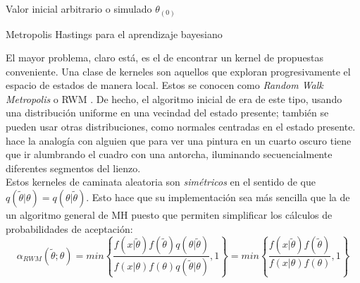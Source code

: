 \begin{algorithm}
\DontPrintSemicolon



Valor inicial arbitrario o simulado $\theta_{(0)}$\;

\caption{Metropolis Hastings para el aprendizaje bayesiano \label{alg:MH}}
\end{algorithm}

El mayor problema, claro está, es el de encontrar un kernel de propuestas conveniente. Una clase de kerneles son aquellos que exploran progresivamente el espacio de estados de manera local. Estos se conocen como \textit{Random Walk Metropolis} o RWM \parencite{RobertCasella10}. De hecho, el algoritmo inicial de \textcite{Metropolis53} era de este tipo, usando una distribución uniforme en una vecindad del estado presente; también se pueden usar otras distribuciones, como normales centradas en el estado presente. \textcite{Robert15} hace la analogía con alguien que para ver una pintura en un cuarto oscuro tiene que ir alumbrando el cuadro con una antorcha, iluminando secuencialmente diferentes segmentos del lienzo.\\

Estos kerneles de caminata aleatoria son \textit{simétricos} en el sentido de que $q(\tilde{\theta}|\theta) = q(\theta |\tilde{\theta})$. Esto hace que su implementación sea más sencilla que la de un algoritmo general de MH puesto que permiten simplificar los cálculos de probabilidades de aceptación:
\begin{equation*}
\alpha_{RWM}(\tilde{\theta};\theta)=min\left\lbrace\dfrac{f(x|\tilde{\theta})f(\tilde{\theta})q(\theta|\tilde{\theta})}{f(x|\theta)f(\theta)q(\tilde{\theta}|\theta)},1\right\rbrace = min\left\lbrace\dfrac{f(x|\tilde{\theta})f(\tilde{\theta})}{f(x|\theta)f(\theta)},1\right\rbrace
\end{equation*}

